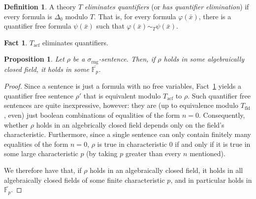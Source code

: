 \documentclass{article}
\theoremstyle{plain}
\newtheorem{prop}[thm]{Proposition}
\theoremstyle{definition}
\newtheorem{defn}[thm]{Definition}
\newtheorem{fact}[thm]{Fact}
\newcommand{\defterm}{\emph}
\newcommand{\ringsig}{\sigma_{\operatorname{rng}}}
\newcommand{\fieldthy}{T_{\operatorname{fld}}}
\newcommand{\acf}{T_{\operatorname{acf}}}
\newcommand{\tuple}{\bar}
\renewcommand{\phi}{\varphi}
\begin{document}
\begin{defn}
  A theory $T$ \defterm{eliminates quantifiers} (or \defterm{has
    quantifier elimination}) if every formula is $\Delta_0$ modulo
  $T$. That is, for every formula $\phi(\tuple{x})$, there is a
  quantifier free formula $\psi(\tuple{x})$ such that $\phi(\tuple{x})
  \sim_T \psi(\tuple{x})$.
\end{defn}

\begin{fact}\label{fact:acf-qe}
  $\acf$ eliminates quantifiers.
\end{fact}

\begin{prop}\label{prop:anything-goestofinitecharacteristic}
  Let $\rho$ be a $\ringsig$-sentence. Then, if $\rho$ holds in some
  algebraically closed field, it holds in some
  $\overline{\mathbb{F}_p}$.
\end{prop}
\begin{proof}
  Since a sentence is just a formula with no free variables,
  Fact~\ref{fact:acf-qe} yields a quantifier free sentence $\rho'$
  that is equivalent modulo $\acf$ to $\rho$. Such quantifier free
  sentences are quite inexpressive, however: they are (up to
  equivalence modulo $\fieldthy$, even) just boolean combinations of
  equalities of the form $n = 0$. Consequently, whether $\rho$ holds
  in an algebrically closed field depends only on the field's
  characteristic. Furthermore, since a single sentence can only
  contain finitely many equalities of the form $n = 0$, $\rho$ is true
  in characteristic 0 if and only if it is true in some large
  characteristic $p$ (by taking $p$ greater than every $n$ mentioned).

  We therefore have that, if $\rho$ holds in an algebraically closed
  field, it holds in all algebraically closed fields of some finite
  characteristic $p$, and in particular holds in
  $\overline{\mathbb{F}_p}$.
\end{proof}
\end{document}
